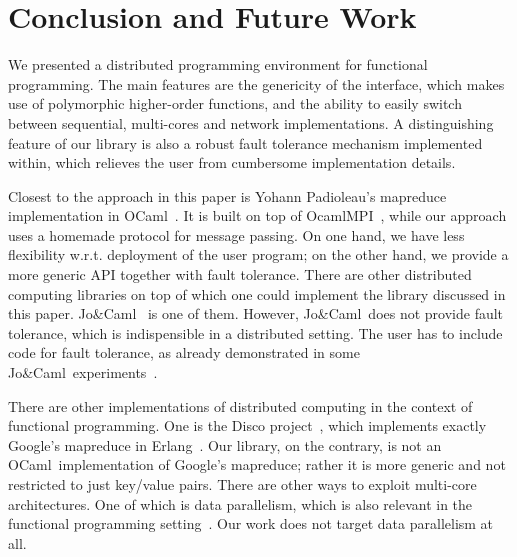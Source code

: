 \documentclass[preprint]{sigplanconf}
\newcommand{\Ocaml}{OCaml}
\newcommand{\JoCaml}{Jo{\&\!}Caml}
\begin{document}
\section{Conclusion and Future Work}\label{sec:future}

We presented a distributed programming environment for functional
programming. The main features are the genericity of the interface,
which makes use of polymorphic higher-order functions, and the ability
to easily switch between sequential, multi-cores and network
implementations. A distinguishing feature of our library is also a
robust fault tolerance mechanism implemented within, which relieves
the user from cumbersome implementation details.

Closest to the approach in this paper is Yohann Padioleau's mapreduce
implementation in \Ocaml~\cite{poor-man-mapreduce}.  It is built on
top of OcamlMPI~\cite{ocamlMPI}, while our approach uses a homemade
protocol for message passing.  On one hand, we have less flexibility
w.r.t. deployment of the user program; on the other hand, we provide a
more generic API together with fault tolerance.  There are other
distributed computing libraries on top of which one could implement
the library discussed in this paper. \JoCaml~\cite{jocaml} is one of
them. However, \JoCaml\ does not provide fault tolerance, which is
indispensible in a distributed setting. The user has to include code
for fault tolerance, as already demonstrated in some \JoCaml\
experiments~\cite{mandel2008}. 

There are other implementations of distributed computing in the
context of functional programming. One is the Disco
project~\cite{disco}, which implements exactly Google's mapreduce in
Erlang~\cite{erlang}. Our library, on the contrary, is not an \Ocaml\
implementation of Google's mapreduce; rather it is more generic and
not restricted to just key/value pairs.
There are other ways to exploit multi-core architectures. One of which
is data parallelism, which is also relevant in the functional
programming setting~\cite{parallel-haskell}. Our work
does not target data parallelism at all.
\end{document}
